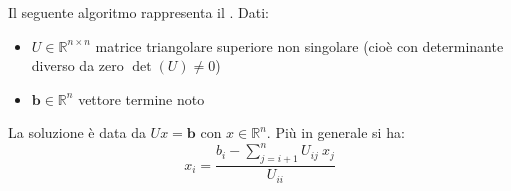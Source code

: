 \begin{definitionbox}\label{metodo delle sostituzioni all'indietro}
    Il seguente algoritmo rappresenta il . Dati:
    \begin{itemize}
        \item $U \in \mathbb{R}^{n \times n}$ matrice triangolare superiore non singolare (cioè con determinante diverso da zero $\det\left(U\right) \ne 0$)
        
        \item $\mathbf{b} \in \mathbb{R}^{n}$ vettore termine noto
    \end{itemize}
    La soluzione è data da $Ux = \mathbf{b}$ con $x \in \mathbb{R}^{n}$. Più in generale si ha:
    \begin{equation}\label{eq: metodo delle sostituzioni all'indietro}
        x_{i} = \dfrac{
            b_{i} - \displaystyle\sum_{j=i+1}^{n} U_{ij} \: x_{j}
        }{
            U_{ii}
        }
    \end{equation}
\end{definitionbox}

